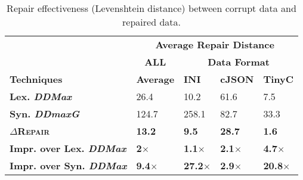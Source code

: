 \documentclass[acmsmall,screen,review,anonymous]{acmart}
\newcommand{\approach}{\textsc{$\Delta$Repair}\xspace}
\newcommand{\ddmax}{\textit{DDMax}\xspace}
\newcommand{\ddmaxg}{\textit{DDmaxG}\xspace}
\begin{document}

\begin{table}[!tbp]
\caption{Repair effectiveness (Levenshtein distance) between corrupt data and repaired data.}
\begin{tabular}{|p{4.0cm}|p{1.5cm}|p{1.5cm}|p{1.5cm}|p{1.5cm}|}
\hline
 &  \multicolumn{4}{c|}{\textbf{Average Repair Distance}}  \\
&  \multicolumn{1}{c|}{\textbf{ALL}} &   \multicolumn{3}{c|}{\textbf{Data Format}}  \\
\textbf{Techniques} & \textbf{Average}  & \textbf{INI} & \textbf{cJSON} & \textbf{TinyC} \\
\hline
\textbf{Lex. \ddmax} & 26.4 & {10.2} &  61.6 &  7.5 \\
\textbf{Syn. \ddmaxg} & 124.7 &  258.1 & 82.7 &  33.3 \\
\hline
\textbf{\approach} & \textbf{13.2}  & \textbf{9.5} &  \textbf{28.7} & \textbf{1.6} \\
\hline
\textbf{Impr. over Lex. \ddmax} & \textbf{2$\times$} & \textbf{1.1$\times$} & \textbf{2.1$\times$} & \textbf{4.7$\times$} \\
\textbf{Impr. over Syn. \ddmax} & \textbf{9.4$\times$} & \textbf{27.2$\times$} & \textbf{2.9$\times$} & \textbf{20.8$\times$} \\
\hline
\end{tabular}
\label{tab:datarepairquality}
\end{table}
\end{document}
